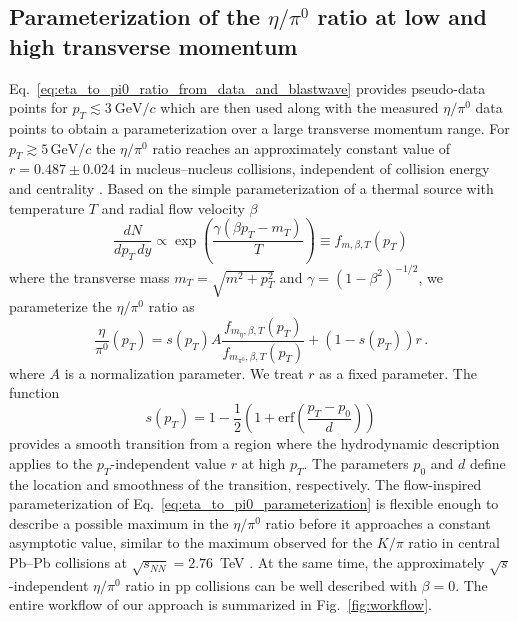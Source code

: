 \documentclass[%
 reprint,
 amsmath,amssymb,
 aps,
prc,
]{revtex4-2}
\begin{document}
\subsection{\boldmath Parameterization of the $\eta/\pi^0$ ratio at low and high transverse momentum}

Eq.~\ref{eq:eta_to_pi0_ratio_from_data_and_blastwave} provides pseudo-data points for $p_T \lesssim 3~\mathrm{GeV}/c$ which are then used along with the measured $\eta/\pi^0$ data points to obtain a parameterization over a large transverse momentum range. For $p_T \gtrsim 5\,\mathrm{GeV}/c$ the $\eta/\pi^0$ ratio reaches an approximately constant value of $r = 0.487 \pm 0.024$ in nucleus--nucleus collisions, independent of collision energy and centrality \cite{Ren:2021pzi}. Based on the simple parameterization of a thermal source with temperature $T$ and radial flow velocity $\beta$
\begin{equation}
  \frac{dN}{dp_T\,dy} \propto \exp\left(\frac{\gamma (\beta p_T - m_T)}{T} \right) \equiv f_{m, \beta, T}(p_T)
\end{equation}
where the transverse mass $m_T = \sqrt{m^2 + p_T^2}$ and $\gamma = (1 - \beta^2)^{-1/2}$, 
we parameterize the $\eta/\pi^0$ ratio as
\begin{equation}
 \frac{\eta}{\pi^0}(p_T) = s(p_T) A \frac{f_{m_\eta, \beta, T}(p_T)}{f_{m_{\pi^0}, \beta, T}(p_T)} + (1 - s(p_T)) r \,.
 \label{eq:eta_to_pi0_parameterization}
\end{equation}
where $A$ is a normalization parameter. We treat $r$ as a fixed parameter. The function
\begin{equation}
  s(p_T) = 1 - \frac{1}{2} \left(1 + \mathrm{erf}\left(\frac{p_T - p_0}{d}\right)\right) 
\end{equation}
provides a smooth transition from a region where the hydrodynamic description applies to the $p_T$-independent value $r$ at high $p_T$. The parameters $p_0$ and $d$ define the location and smoothness of the transition, respectively.
The flow-inspired parameterization of Eq.~\ref{eq:eta_to_pi0_parameterization} is flexible enough to describe a possible maximum in the $\eta/\pi^0$ ratio before it approaches a constant asymptotic value, similar to the maximum observed for the $K/\pi$ ratio in central Pb--Pb collisions at $\sqrt{s_{NN}}=2.76$~TeV \cite{ALICE:2014juv}. At the same time, the approximately $\sqrt{s}$-independent $\eta/\pi^0$ ratio in pp collisions can be well described with $\beta = 0$. The entire workflow of our approach is summarized in Fig.~\ref{fig:workflow}.
\end{document}
